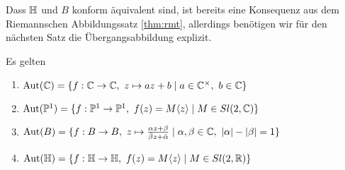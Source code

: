 \begin{rem}
  Dass $\mathbb{H}$ und $B$ konform äquivalent sind, ist bereits eine
  Konsequenz aus dem Riemannschen Abbildungssatz \ref{thm:rmt}, allerdings benötigen
  wir für den nächsten Satz die Übergangsabbildung explizit.
\end{rem}

\begin{thm}
  \label{thm:aut}
  Es gelten
  \begin{enumerate}
  \item $\operatorname{Aut}(\mathbb{C}) = \{ f: \mathbb{C} \rightarrow \mathbb{C}, \ z \mapsto az + b \mid a \in
    \mathbb{C}^\times, \ b \in \mathbb{C} \}$
  \item $\Aut(\P^1) = \{ f: \P^1 \ra \P^1,\ f(z) = M\langle z \rangle \mid
    M \in Sl(2, \C) \}$
  \item $\operatorname{Aut}(B) = \{ f: B \rightarrow B,\ z \mapsto \frac{\alpha z +
      \beta}{\bar \beta z + \bar \alpha} \mid \alpha, \beta \in \mathbb{C}, \
    |\alpha |- |\beta| = 1\}$
  \item $\operatorname{Aut}(\mathbb{H}) = \{f: \mathbb{H} \rightarrow \mathbb{H},\ f(z) = M\langle z \rangle 
    \mid M \in Sl(2, \mathbb{R}) \}$
  \end{enumerate}
\end{thm}

